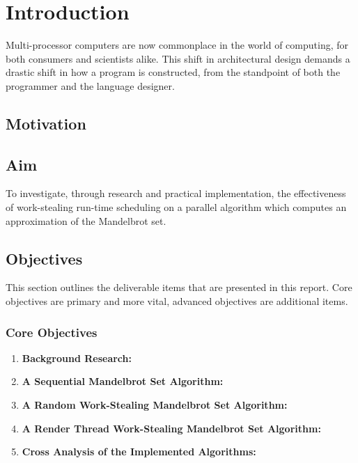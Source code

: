 \chapter{Introduction}


Multi-processor computers are now commonplace in the world of computing, for both consumers and scientists alike. 
This shift in architectural design demands a drastic shift in how a program is constructed, from the standpoint of both
the programmer and the language designer.

\section*{Motivation}



\section*{Aim}

To investigate, through research and practical implementation, the effectiveness of work-stealing run-time scheduling on
a parallel algorithm which computes an approximation of the Mandelbrot set.

\section*{Objectives}
This section outlines the deliverable items that are presented in this report.
Core objectives are primary and more vital, advanced objectives are additional items.

\subsection*{Core Objectives}
\begin{enumerate}
\item \textbf{Background Research:}
\item \textbf{A Sequential Mandelbrot Set Algorithm:}
\item \textbf{A Random Work-Stealing Mandelbrot Set Algorithm:}
\item \textbf{A Render Thread Work-Stealing Mandelbrot Set Algorithm:}
\item \textbf{Cross Analysis of the Implemented Algorithms:}
\setcounter{saveenum}{\value{enumi}}
\end{enumerate}

